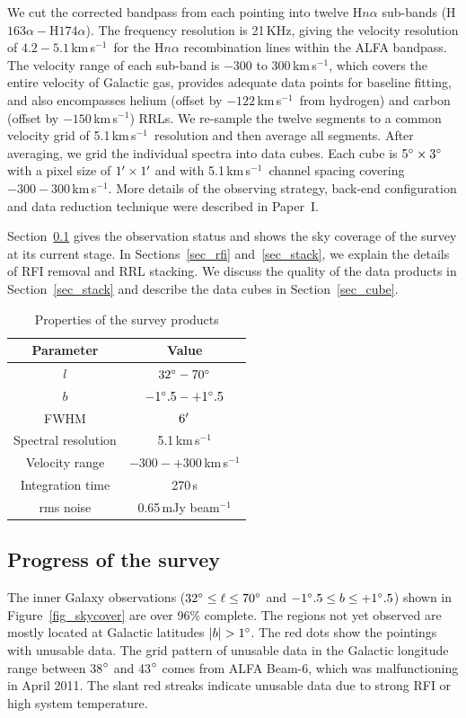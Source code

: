 \documentclass[manuscript]{aastex61}
\newcommand{\kms}{\,km\,s$^{-1}$}
\begin{document}
We cut the corrected bandpass from each pointing into twelve H$n\alpha$ sub-bands (H$163\alpha - $H$174\alpha$).
The frequency resolution is 21\,KHz, giving the velocity resolution of $4.2 - 5.1$\kms\ for the H$n\alpha$ recombination lines within the ALFA bandpass.  
The velocity range of each sub-band is $-300$ to 300\kms, which covers the entire velocity of Galactic gas, provides adequate data points for baseline fitting, and also encompasses helium (offset by $-122$\kms\ from hydrogen) and carbon (offset by $-150$\kms) RRLs.
We re-sample the twelve segments to a common velocity grid of 5.1\kms\ resolution and then average all segments.
After averaging, we grid the individual spectra into data cubes.  
Each cube is $5\mbox{$^\circ$} \times 3\mbox{$^\circ$}$ with a pixel size of $1\mbox{$^\prime$} \times 1 \mbox{$^\prime$}$ and with 5.1\kms\ channel spacing covering $-300 - 300$\kms.
More details of the observing strategy, back-end configuration and data reduction technique were described in Paper~I.  

Section~\ref{sec_obs} gives the observation status and shows the sky coverage of the survey at its current stage.
In Sections~\ref{sec_rfi} and~\ref{sec_stack}, we explain the details of RFI removal and RRL stacking.
We discuss the quality of the data products in Section~\ref{sec_stack} and describe the data cubes in Section~\ref{sec_cube}.

\begin{table}[tbhp]
\centering
\caption{Properties of the survey products \label{tab_survey}}
\begin{threeparttable}
\begin{tabular}{cc}
\hline
\hline
 Parameter & Value\\
\hline
$l$  & $32\mbox{$^\circ$} - 70\mbox{$^\circ$}$ \\
$b$  & $-1\mbox{$^\circ$}.5 - +1\mbox{$^\circ$}.5$ \\
FWHM & $6\mbox{$^\prime$}$ \\
Spectral resolution & 5.1\kms \\
Velocity range & $-300 - +300$\kms\\
Integration time & 270\,s \\
rms noise & 0.65\,mJy beam$^{-1}$ \\
\hline
\end{tabular}
\end{threeparttable}
\end{table}

\subsection{Progress of the survey} \label{sec_obs}
The inner Galaxy observations ($32\mbox{$^\circ$} \le \ell \le 70 \mbox{$^\circ$}$ and $-1\mbox{$^\circ$}.5 \le b \le +1\mbox{$^\circ$}.5$) shown in Figure~\ref{fig_skycover} are over 96\% complete.
The regions not yet observed are mostly located at Galactic latitudes $|b|>1\degr$.  The red dots show the pointings with unusable data.  The grid pattern of unusable data in the Galactic longitude range between 38$\mbox{$^\circ$}$ and 43$\mbox{$^\circ$}$ comes from ALFA Beam-6, which was malfunctioning in April 2011.
The slant red streaks indicate unusable data due to strong RFI or high system temperature.
\end{document}
